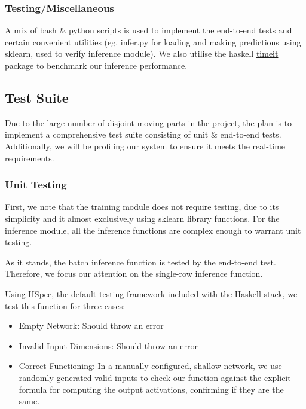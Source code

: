 \documentclass[12pt, titlepage]{article}
\begin{document}
\subsubsection{Testing/Miscellaneous}
A mix of bash \& python scripts is used to implement the end-to-end tests and certain convenient utilities (eg. infer.py for loading and making predictions using sklearn, used to verify inference module). We also utilise the haskell \href{https://hackage.haskell.org/package/timeit}{timeit} package to benchmark our inference performance.

\subsection{Test Suite}
Due to the large number of disjoint moving parts in the project, the plan is to implement a comprehensive test suite consisting of unit \& end-to-end tests. Additionally, we will be profiling our system to ensure it meets the real-time requirements.

\subsubsection{Unit Testing}
First, we note that the training module does not require testing, due to its simplicity and it almost exclusively using sklearn library functions. For the inference module, all the inference functions are complex enough to warrant unit testing.\bigskip

As it stands, the batch inference function is tested by the end-to-end test. Therefore, we focus our attention on the single-row inference function.

Using HSpec, the default testing framework included with the Haskell stack, we test this function for three cases:
\begin{itemize}
	\item Empty Network: Should throw an error
	\item Invalid Input Dimensions: Should throw an error
	\item Correct Functioning: In a manually configured, shallow network, we use randomly generated valid inputs to check our function against the explicit formula for computing the output activations, confirming if they are the same.
\end{itemize}
\end{document}
